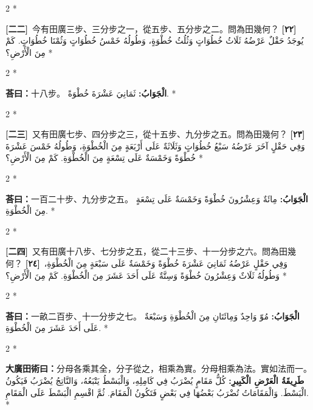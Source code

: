 \documentclass[11pt,a4paper]{article}
\newcommand{\ar}[1]{\arabicfont\beginR #1\endR}
\newcommand{\problemnum}[1]{\textbf{[\ignorespaces#1\unskip]}}
\newenvironment{bilingual}{%
  \begin{paracol}{2}%
  \switchcolumn[0]*%
}{%
  \end{paracol}%
}
\newcommand{\cnline}[1]{\switchcolumn[0]\noindent #1 \switchcolumn[1]}
\newcommand{\arline}[1]{\noindent\ar{#1} \switchcolumn[0]*}
\newenvironment{prob bilingual}{%
  \begin{paracol}{2}%
  \switchcolumn[0]*%
}{%
  \end{paracol}%
  \vspace{0.3em}%
}
\begin{document}
\begin{bilingual}
\cnline{\problemnum{二二}\, 今有田廣三步、三分步之一，從五步、五分步之二。問為田幾何？}
\arline{\problemnum{٢٢}\, يُوجَدُ حَقْلٌ عَرْضُهُ ثَلَاثُ خُطُوَاتٍ وَثُلُثُ خُطْوَةٍ، وَطُولُهُ خَمْسُ خُطُوَاتٍ وَثُمْنَا خُطُوَاتٍ. كَمْ مِنَ الْأَرْضِ؟}
\end{bilingual}

\begin{bilingual}
\cnline{\textcolor{answercolor}{\textbf{荅曰：}}十八步。}
\arline{\textcolor{answercolor}{\textbf{الْجَوَابُ:}} ثَمَانِيَ عَشْرَةَ خُطْوَةً.}
\end{bilingual}

\begin{bilingual}
\cnline{\problemnum{二三}\, 又有田廣七步、四分步之三，從十五步、九分步之五。問為田幾何？}
\arline{\problemnum{٢٣}\, وَفِي حَقْلٍ آخَرَ عَرْضُهُ سَبْعُ خُطُوَاتٍ وَثَلَاثَةٌ عَلَى أَرْبَعَةٍ مِنَ الْخُطْوَةِ، وَطُولُهُ خَمْسَ عَشْرَةَ خُطْوَةً وَخَمْسَةٌ عَلَى تِسْعَةٍ مِنَ الْخُطْوَةِ. كَمْ مِنَ الْأَرْضِ؟}
\end{bilingual}

\begin{bilingual}
\cnline{\textcolor{answercolor}{\textbf{荅曰：}}一百二十步、九分步之五。}
\arline{\textcolor{answercolor}{\textbf{الْجَوَابُ:}} مِائَةٌ وَعِشْرُونَ خُطْوَةً وَخَمْسَةٌ عَلَى تِسْعَةٍ مِنَ الْخُطْوَةِ.}
\end{bilingual}

\begin{bilingual}
\cnline{\problemnum{二四}\, 又有田廣十八步、七分步之五，從二十三步、十一分步之六。問為田幾何？}
\arline{\problemnum{٢٤}\, وَفِي حَقْلٍ عَرْضُهُ ثَمَانِيَ عَشْرَةَ خُطْوَةً وَخَمْسَةٌ عَلَى سَبْعَةٍ مِنَ الْخُطْوَةِ، وَطُولُهُ ثَلَاثٌ وَعِشْرُونَ خُطْوَةً وَسِتَّةٌ عَلَى أَحَدَ عَشَرَ مِنَ الْخُطْوَةِ. كَمْ مِنَ الْأَرْضِ؟}
\end{bilingual}

\begin{bilingual}
\cnline{\textcolor{answercolor}{\textbf{荅曰：}}一畝二百步、十一分步之七。}
\arline{\textcolor{answercolor}{\textbf{الْجَوَابُ:}} مُوّ وَاحِدٌ وَمِائَتَانِ مِنَ الْخُطْوَةِ وَسَبْعَةٌ عَلَى أَحَدَ عَشَرَ مِنَ الْخُطْوَةِ.}
\end{bilingual}

\begin{bilingual}
\cnline{%
\textcolor{methodcolor}{\textbf{大廣田術曰：}}分母各乘其全，分子從之，相乘為實。分母相乘為法。實如法而一。
}
\arline{%
\textcolor{methodcolor}{\textbf{طَرِيقَةُ الْعَرْضِ الْكَبِيرِ:}} كُلُّ مَقَامٍ يُضْرَبُ فِي كَامِلِهِ، وَالْبَسْطُ يَتْبَعُهُ، وَالنَّاتِجُ يُضْرَبُ فَيَكُونُ الْبَسْطَ. وَالْمَقَامَاتُ تُضْرَبُ بَعْضُهَا فِي بَعْضٍ فَتَكُونُ الْمَقَامَ. ثُمَّ اقْسِمِ الْبَسْطَ عَلَى الْمَقَامِ.
}
\end{bilingual}
\end{document}
